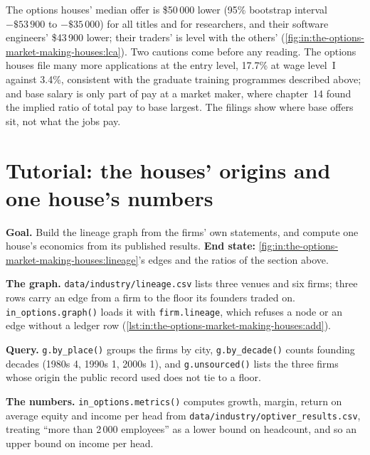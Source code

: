 The options houses' median offer is \$50\,000 lower (95\% bootstrap interval $-\$53\,900$ to $-\$35\,000$) for all titles
and for researchers, and their software engineers' \$43\,900 lower; their traders' is level with the others'
(\cref{fig:in:the-options-market-making-houses:lca}). Two cautions come before any reading. The options houses file
many more applications at the entry level, 17.7\% at wage level~I against 3.4\%, consistent with the graduate
training programmes described above; and base salary is only part of pay at a market maker, where chapter~14 found the
implied ratio of total pay to base largest. The filings show where base offers sit, not what the jobs pay.

\section{Tutorial: the houses' origins and one house's numbers}\label{tut:in:the-options-market-making-houses:tut}

\begin{tutorial}
\textbf{Goal.} Build the lineage graph from the firms' own statements, and compute one house's economics from its
published results. \textbf{End state:} \cref{fig:in:the-options-market-making-houses:lineage}'s edges and the ratios of
the section above.
\begin{tutsteps}
\item \textbf{The graph.} \texttt{data/industry/lineage.csv} lists three venues and six firms; three rows carry an edge
from a firm to the floor its founders traded on. \texttt{in\_options.graph()} loads it with \texttt{firm.lineage},
which refuses a node or an edge without a ledger row
(\cref{lst:in:the-options-market-making-houses:add}).
\label{lst:in:the-options-market-making-houses:add}
\item \textbf{Query.} \texttt{g.by\_place()} groups the firms by city, \texttt{g.by\_decade()} counts founding decades
(1980s 4, 1990s 1, 2000s 1), and \texttt{g.unsourced()} lists the three firms whose origin the public record
used does not tie to a floor.
\item \textbf{The numbers.} \texttt{in\_options.metrics()} computes growth, margin, return on average equity and income
per head from \texttt{data/industry/optiver\_results.csv}, treating ``more than 2\,000 employees'' as a lower bound on
headcount, and so an upper bound on income per head.
\end{tutsteps}
\end{tutorial}

